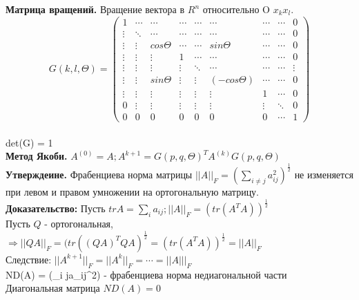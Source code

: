     \textbf{Матрица вращений.} Вращение вектора в \(R^n\) относительно O \(x_k x_l\).
    \[
    G(k, l, \Theta) = 
    \begin{pmatrix}
    1      & \cdots & \cdots     &\cdots  & \cdots &\cdots & \cdots & \cdots &0  \\
    \vdots & \ddots & \cdots     &\cdots  & \cdots & \cdots &\cdots & \cdots & 0\\
    \vdots & \vdots & cos \Theta & \cdots &  \cdots & sin \Theta & \cdots & \cdots & 0\\
    \vdots & \vdots & \vdots     & 1      & \cdots & \cdots & \cdots & \cdots & 0\\
    \vdots & \vdots & \vdots     & \vdots & \ddots & \cdots & \cdots & \cdots & \vdots \\

    \vdots & \vdots & sin \Theta    & \vdots & \vdots & (-cos \Theta) & \cdots & \cdots & 0 \\
        \vdots & \vdots & \vdots     & \vdots & \vdots & \vdots & 1 & \cdots & 0 \\
    0 & \vdots & \vdots & \vdots & \vdots & \vdots & \vdots & \ddots & 0 \\
        0 & 0 & 0 & 0 &0 & 0 & 0 & \cdots & 1
    \end{pmatrix}
    \] \\
    det(G) = 1 \\
    
    \textbf{Метод Якоби.} \(A^{(0)} = A; A^{k+1}=G(p,q,\Theta)^TA^{(k)}G(p,q,\Theta)\) \\

    \textbf{Утверждеине.} Фрабенциева норма матрицы \(||A||_F = (\sum_{i \neq j}a_{ij}^2)^{\frac{1}{2}}\) не изменяется при левом и правом умножении на ортогональную матрицу. \\

    \textbf{Доказательство:} Пусть \(tr A = \sum_ia_{ij}; ||A||_F = (tr(A^TA))^{\frac{1}{2}}\) \\
    Пусть \(Q\) - ортогональная, \(\Rightarrow ||QA||_F=(tr((QA)^TQA)^{\frac{1}{2}} = (tr(A^TA))^{\frac{1}{2}} = ||A||_F\) \\
    Следствие: \(||A^{k+1}||_F=||A^k||_F=\cdots=||A|||_F\) \\
    ND(A) = (\sum_{i \neq j}a_{ij}^2) - фрабенциева норма недиагональной части \\
    Диагональная матрица \(ND(A) = 0\) \\

